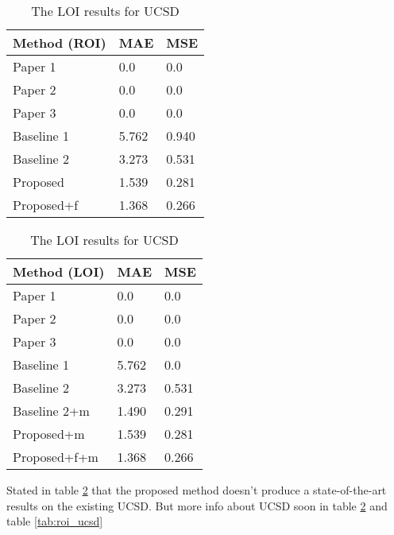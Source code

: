 \begin{table}[!htb]
    \begin{minipage}{.5\linewidth}
      \centering
		\begin{tabular}{lll}
		\hline
		Method (ROI)                               & MAE & MSE \\ \hline
		\multicolumn{1}{l|}{Paper 1} & 0.0 & 0.0 \\
		\multicolumn{1}{l|}{Paper 2} & 0.0 & 0.0 \\
		\multicolumn{1}{l|}{Paper 3} & 0.0 & 0.0 \\
		\multicolumn{1}{l|}{Baseline 1}          & 5.762 & 0.940 \\
		\multicolumn{1}{l|}{Baseline 2}          & 3.273 & 0.531 \\
		\multicolumn{1}{l|}{Proposed}        	 & 1.539 & 0.281 \\
		\multicolumn{1}{l|}{Proposed+f} & 1.368 & 0.266 \\ \hline
		\end{tabular}
		\caption{\label{tab:roi_ucsd}The ROI results for UCSD}
	\end{minipage}
	\begin{minipage}{.5\linewidth}
      \centering
		\begin{tabular}{lll}
		\hline
		Method (LOI)                               & MAE & MSE \\ \hline
		\multicolumn{1}{l|}{Paper 1} & 0.0 & 0.0 \\
		\multicolumn{1}{l|}{Paper 2} & 0.0 & 0.0 \\
		\multicolumn{1}{l|}{Paper 3} & 0.0 & 0.0 \\
		\multicolumn{1}{l|}{Baseline 1}          & 5.762 & 0.0 \\
		\multicolumn{1}{l|}{Baseline 2}          & 3.273 & 0.531 \\
		\multicolumn{1}{l|}{Baseline 2+m}      & 1.490 & 0.291 \\
		\multicolumn{1}{l|}{Proposed+m}        	 & 1.539 & 0.281 \\
		\multicolumn{1}{l|}{Proposed+f+m} & 1.368 & 0.266 \\ \hline
		\end{tabular}
		\caption{\label{tab:loi_ucsd}The LOI results for UCSD}
	\end{minipage}
\end{table}

Stated in table \ref{tab:loi_ucsd} that the proposed method doesn't produce a state-of-the-art results on the existing UCSD. But more info about UCSD soon in table \ref{tab:loi_ucsd} and table \ref{tab:roi_ucsd}


